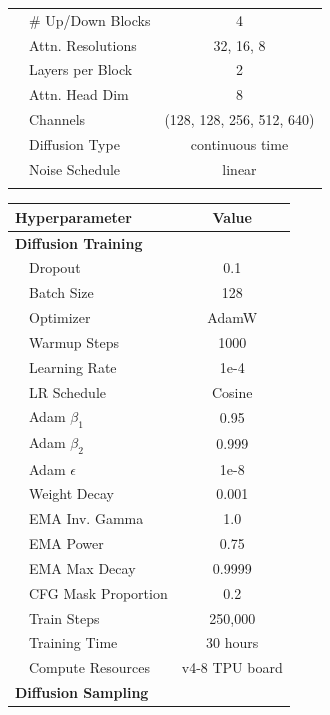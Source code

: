 \begin{table}[ht]
{\begin{minipage}[t]{0.48\textwidth}
\begin{tabular}[t]{llc}
            & \# Up/Down Blocks & 4 \\
            & Attn. Resolutions & 32, 16, 8 \\
            & Layers per Block & 2 \\
            & Attn. Head Dim & 8 \\
            & Channels & (128, 128, 256, 512, 640) \\
            & Diffusion Type & continuous time \\
            & Noise Schedule & linear \\
            \bottomrule \\
        \end{tabular}
    \end{minipage}
    \hfill
    \begin{minipage}[t]{0.48\textwidth}
        \begin{tabular}[t]{llc}
            \toprule
            \multicolumn{2}{l}{{Hyperparameter}} & {Value} \\
            \midrule
            \multicolumn{2}{l}{\textbf{Diffusion Training}} & \\
            & Dropout & 0.1 \\
            & Batch Size & 128 \\
            & Optimizer & AdamW \\
            & Warmup Steps & 1000 \\
            & Learning Rate & 1e-4 \\
            & LR Schedule & Cosine \\
            & Adam $\beta_1$ & 0.95 \\
            & Adam $\beta_2$ & 0.999 \\
            & Adam $\epsilon$ & 1e-8 \\
            & Weight Decay & 0.001 \\
            & EMA Inv. Gamma & 1.0 \\
            & EMA Power & 0.75 \\
            & EMA Max Decay & 0.9999 \\
            & CFG Mask Proportion & 0.2 \\
            & Train Steps & 250,000 \\
            & Training Time & 30 hours \\
            & Compute Resources & v4-8 TPU board \\
            \multicolumn{2}{l}{\textbf{Diffusion Sampling}} & \\

\end{tabular}
\end{minipage}}
\end{table}
